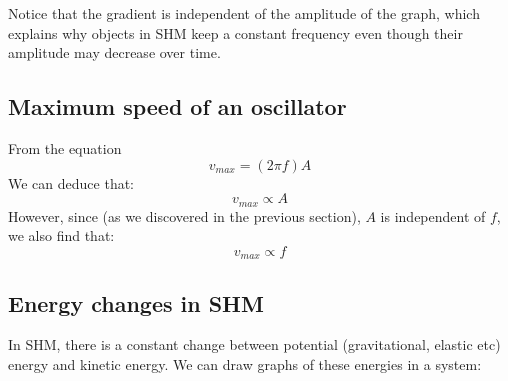 \documentclass{article}
\begin{document}
\begin{center}
\end{center}

Notice that the gradient is independent of the amplitude of the graph, which explains why objects in SHM keep a constant frequency even though their amplitude may decrease over time.

\subsection*{Maximum speed of an oscillator}
From the equation 
\[
v_{max} = (2 \pi f)A
\]
We can deduce that:
\[
	v_{max} \propto A
\]
However, since (as we discovered in the previous section), $A$ is independent of $f$, we also find that:
\[
	v_{max} \propto f
\]

\subsection*{Energy changes in SHM}
In SHM, there is a constant change between potential (gravitational, elastic etc) energy and kinetic energy. We can draw graphs of these energies in a system:
\end{document}
